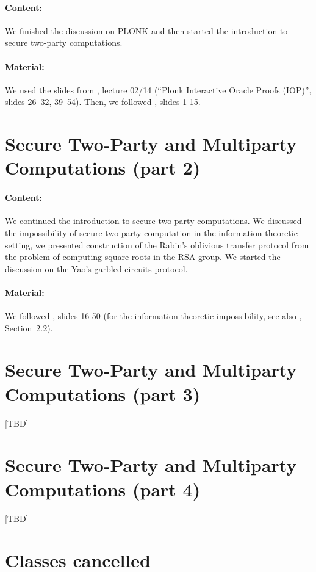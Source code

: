 \documentclass{llncs}
\begin{document}
\paragraph{Content:} We finished the discussion on PLONK and then started the introduction to secure two-party computations.

\paragraph{Material:}  We used the slides from \cite{ZKlearning}, lecture 02/14 (``Plonk Interactive Oracle Proofs (IOP)'', slides 26--32, 39--54). Then, we followed \cite{MPC}, slides 1-15.


\section{Secure Two-Party and Multiparty Computations (part 2)}

\paragraph{Content:}
We continued the introduction to secure two-party computations. We discussed the impossibility of secure two-party computation in the information-theoretic setting, we presented construction of the Rabin's oblivious transfer protocol from the problem of computing square roots in the RSA group. We started the discussion on the Yao's garbled circuits protocol.

\paragraph{Material:} We followed \cite{MPC}, slides 16-50 (for the information-theoretic impossibility, see also \cite{Wichs17}, Section~2.2).

\section{Secure Two-Party and Multiparty Computations (part 3)}

[TBD]

\section{Secure Two-Party and Multiparty Computations (part 4)}

[TBD]


\section{Classes cancelled}
\end{document}
